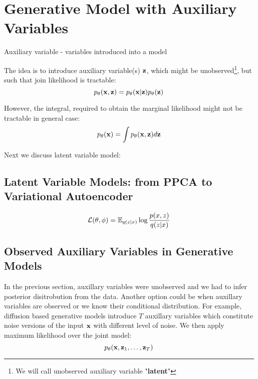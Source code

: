 \section{Generative Model with Auxiliary Variables}
\begin{definition}
	Auxiliary variable - variables introduced into a model
\end{definition}

 The idea is to introduce auxiliary variable(s) ${\mathbf{z}}$, which might be unobserved\footnote{We will call unobserved auxiliary variable "\textbf{latent}" },  but such that join likelihood is tractable:
\begin{equation}
p_{\theta}({\mathbf{x}}, {\mathbf{z}}) =  p_{\theta}({\mathbf{x}}|{\mathbf{z}})p_{\theta}({\mathbf{z}})
\end{equation}

However, the integral, required to obtain the marginal likelihood might not be tractable in general case:
\begin{equation}
p_{\theta}({\mathbf{x}}) = \int p_{\theta}({\mathbf{x}}, {\mathbf{z}})d{\mathbf{z}} 
\end{equation}

Next we discuss latent variable model: 
\subsection{Latent Variable Models: from PPCA to Variational Autoencoder}

\begin{equation}\label{eq:intro_elbo}
\mathcal{L}(\theta, \phi) = \E_{q(z|x)} \log\frac{p(x, z)}{q(z|x)}
\end{equation}


\subsection{Observed Auxiliary Variables in Generative Models}
In the previous section, auxillary variables were unobserved and we had to infer posterior disitrobution from the data. Another option could be when auxillary variables are observed or we know their conditional distribution. For example, diffusion based generative models introduce $T$ auxillary variables which constitute noise versions of the input ${\mathbf{x}}$ with different level of noise. We then apply maximum likelihood over the joint model:
\begin{equation}
p_{\theta}({\mathbf{x}}, {\mathbf{z}}_1, \dots, {\mathbf{z}}_T)
\end{equation}

